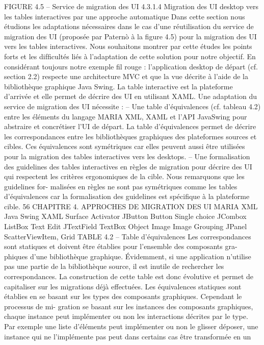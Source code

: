 \documentclass{article}
\begin{document}
 
FIGURE 4.5 – Service de migration des UI
4.3.1.4
Migration des UI desktop vers les tables interactives par une approche automatique
Dans cette section nous étudions les adaptations nécessaires dans le cas d’une réutilisation du
service de migration des UI (proposée par Paternò à la ﬁgure 4.5) pour la migration des UI vers les
tables interactives. Nous souhaitons montrer par cette études les points forts et les difﬁcultés liés à
l’adaptation de cette solution pour notre objectif. En considérant toujours notre exemple ﬁl rouge :
l’application desktop de départ (cf. section 2.2) respecte une architecture MVC et que la vue décrite
à l’aide de la bibliothèque graphique Java Swing. La table interactive est la plateforme d’arrivée et
elle permet de décrire des UI en utilisant XAML. Une adaptation du service de migration des UI
nécessite :
– Une table d’équivalences (cf. tableau 4.2) entre les éléments du langage MARIA XML, XAML
et l’API JavaSwing pour abstraire et concrétiser l’UI de départ. La table d’équivalences permet
de décrire les correspondances entre les bibliothèques graphiques des plateformes sources et
cibles. Ces équivalences sont symétriques car elles peuvent aussi être utilisées pour la migration
des tables interactives vers les desktops.
– Une formalisation des guidelines des tables interactives en règles de migration pour décrire des
UI qui respectent les critères ergonomiques de la cible. Nous remarquons que les guidelines for-
malisées en règles ne sont pas symétriques comme les tables d’équivalences car la formalisation
des guidelines est spéciﬁque à la plateforme cible.
56
CHAPITRE 4. APPROCHES DE MIGRATION DES UI
MARIA XML
Java Swing
XAML Surface
Activator
JButton
Button
Single choice
JCombox
ListBox
Text Edit
JTextField
TextBox
Object
Image
Image
Grouping
JPanel
ScatterViewItem, Grid
TABLE 4.2 – Table d’équivalences
Les correspondances sont statiques et doivent être établies pour l’ensemble des composants gra-
phiques d’une bibliothèque graphique. Évidemment, si une application n’utilise pas une partie de la
bibliothèque source, il est inutile de rechercher les correspondances. La construction de cette table est
donc évolutive et permet de capitaliser sur les migrations déjà effectuées. Les équivalences statiques
sont établies en se basant sur les types des composants graphiques. Cependant le processus de mi-
gration se basant sur les instances des composants graphiques, chaque instance peut implémenter ou
non les interactions décrites par le type. Par exemple une liste d’éléments peut implémenter ou non
le glisser déposer, une instance qui ne l’implémente pas peut dans certains cas être transformée en un
\end{document}
